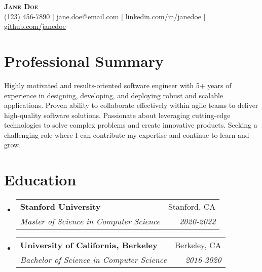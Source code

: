 \documentclass[letterpaper,11pt]{article}
\makeatletter
\newcommand{\resumeSubheading}[4]{
\vspace{-2pt}\item
\begin{tabular*}{0.97\textwidth}[t]{l@{\extracolsep{\fill}}r}
\textbf{#1} & #2 \\
\textit{\small#3} & \textit{\small #4} \\
\end{tabular*}\vspace{-7pt}
}
\newcommand{\resumeSubHeadingListStart}{\begin{itemize}[leftmargin=0.15in, label={}]}
\newcommand{\resumeSubHeadingListEnd}{\end{itemize}}
\makeatother
\begin{document}
\begin{center}
\textbf{\Huge \scshape Jane Doe} \\ \vspace{1pt}
\small (123) 456-7890 $|$ \href{mailto:jane.doe@email.com}{\underline{jane.doe@email.com}} $|$
\href{https://www.linkedin.com/in/janedoe}{\underline{linkedin.com/in/janedoe}} $|$
\href{https://github.com/janedoe}{\underline{github.com/janedoe}}
\end{center}

\section{Professional Summary}
Highly motivated and results-oriented software engineer with 5+ years of experience in designing, developing, and deploying robust and scalable applications. Proven ability to collaborate effectively within agile teams to deliver high-quality software solutions.  Passionate about leveraging cutting-edge technologies to solve complex problems and create innovative products. Seeking a challenging role where I can contribute my expertise and continue to learn and grow.

\section{Education}
\resumeSubHeadingListStart
\resumeSubheading{Stanford University}{Stanford, CA}{Master of Science in Computer Science}{2020-2022}
\resumeSubheading{University of California, Berkeley}{Berkeley, CA}{Bachelor of Science in Computer Science}{2016-2020}
\resumeSubHeadingListEnd
\end{document}
